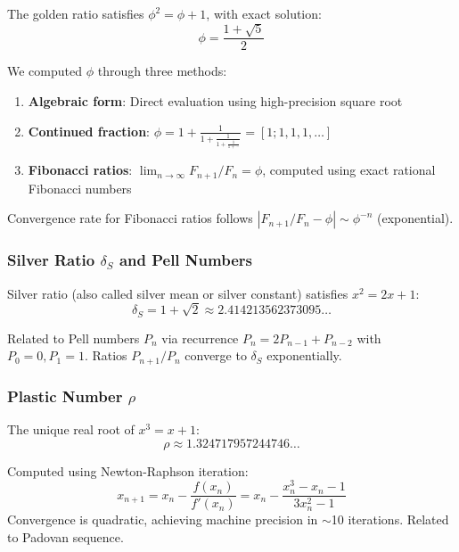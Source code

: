 \documentclass[11pt,a4paper]{article}
\begin{document}
The golden ratio satisfies $\phi^2 = \phi + 1$, with exact solution:
\begin{equation}
\phi = \frac{1 + \sqrt{5}}{2}
\end{equation}

We computed $\phi$ through three methods:
\begin{enumerate}
    \item \textbf{Algebraic form}: Direct evaluation using high-precision square root
    \item \textbf{Continued fraction}: $\phi = 1 + \frac{1}{1 + \frac{1}{1 + \frac{1}{1 + \cdots}}} = [1; 1, 1, 1, \ldots]$
    \item \textbf{Fibonacci ratios}: $\lim_{n \to \infty} F_{n+1}/F_n = \phi$, computed using exact rational Fibonacci numbers
\end{enumerate}

Convergence rate for Fibonacci ratios follows $|F_{n+1}/F_n - \phi| \sim \phi^{-n}$ (exponential).

\subsubsection{Silver Ratio $\delta_S$ and Pell Numbers}

Silver ratio (also called silver mean or silver constant) satisfies $x^2 = 2x + 1$:
\begin{equation}
\delta_S = 1 + \sqrt{2} \approx 2.414213562373095\ldots
\end{equation}

Related to Pell numbers $P_n$ via recurrence $P_n = 2P_{n-1} + P_{n-2}$ with $P_0 = 0, P_1 = 1$. Ratios $P_{n+1}/P_n$ converge to $\delta_S$ exponentially.

\subsubsection{Plastic Number $\rho$}

The unique real root of $x^3 = x + 1$:
\begin{equation}
\rho \approx 1.324717957244746\ldots
\end{equation}

Computed using Newton-Raphson iteration:
\begin{equation}
x_{n+1} = x_n - \frac{f(x_n)}{f'(x_n)} = x_n - \frac{x_n^3 - x_n - 1}{3x_n^2 - 1}
\end{equation}
Convergence is quadratic, achieving machine precision in $\sim$10 iterations. Related to Padovan sequence.
\end{document}
